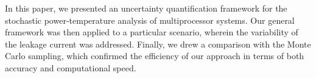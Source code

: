 In this paper, we presented an uncertainty quantification framework for the stochastic power-temperature analysis of multiprocessor systems. Our general framework was then applied to a particular scenario, wherein the variability of the leakage current was addressed. Finally, we drew a comparison with the Monte Carlo sampling, which confirmed the efficiency of our approach in terms of both accuracy and computational speed.
